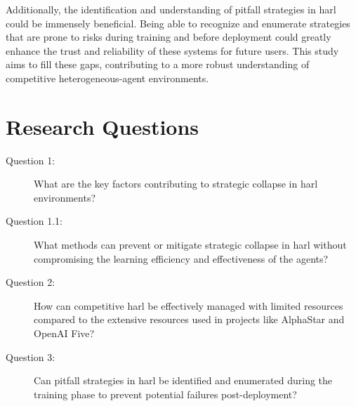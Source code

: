 Additionally, the identification and understanding of pitfall strategies in \gls*{harl} 
could be immensely beneficial. Being able to recognize and enumerate strategies that are prone 
to risks during training and before deployment could greatly enhance the trust and 
reliability of these systems for future users. This study aims to fill these gaps, 
contributing to a more robust understanding of competitive heterogeneous-agent environments.


\section{Research Questions}%
\label{sec:research_question}%
\label{sec:relevance_and_importance}

\begin{description}
    \item[Question 1:] 
    What are the key factors contributing to strategic collapse in \gls*{harl} environments?
    \item[Question 1.1:] 
    What methods can prevent or mitigate strategic collapse in \gls*{harl} without compromising the 
    learning efficiency and effectiveness of the agents?
    \item[Question 2:] 
    How can competitive \gls*{harl} be effectively managed with limited resources compared to the 
    extensive resources used in projects like AlphaStar and OpenAI Five?
    \item[Question 3:] 
    Can pitfall strategies in \gls*{harl} be identified and enumerated during the training phase to 
    prevent potential failures post-deployment?
\end{description}

